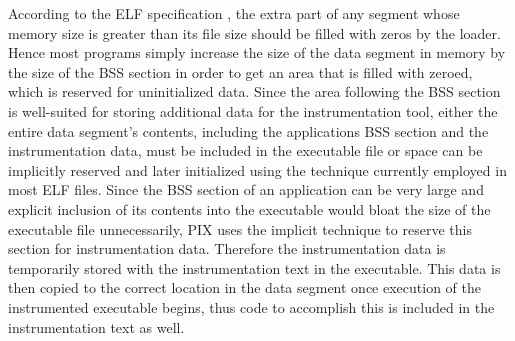 According to the ELF specification \cite{standard1995executable}, the extra part of any
segment whose memory size is greater than its file size should be filled with
zeros by the loader. Hence most programs simply increase the size of the data
segment in memory by the size of the BSS section in order to get an
area that is filled with zeroed, which is reserved for uninitialized data. Since the area following the BSS section is well-suited for
storing additional data for the instrumentation tool, either the entire data
segment's contents, including the applications BSS section and the instrumentation data,
must be included in the executable file or space can be implicitly reserved and later initialized using the
technique currently employed in most ELF files.
Since the BSS section of an application can be very large and explicit inclusion of its contents
into the executable would bloat the size of the executable file unnecessarily, PIX uses the implicit
technique to reserve this section for instrumentation data. Therefore the instrumentation data is
temporarily stored with the instrumentation text in the
executable. This data is then copied to the correct location in the data segment once execution
of the instrumented executable begins, thus code to accomplish this is included in the
instrumentation text as well.
